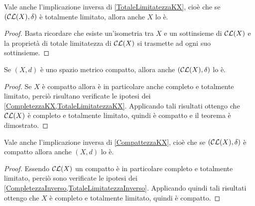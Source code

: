 \begin{remark}\label{TotaleLimitatezzaInverso}
	Vale anche l'implicazione inversa di \cref{TotaleLimitatezzaKX}, cioè che se  $(\mathcal{CL}(X),\delta)$ è totalmente limitato, allora anche $X$ lo è.
\end{remark}
\begin{proof}
	Basta ricordare che esiste un'isometria tra $X$ e un sottinsieme di $\mathcal{CL}(X)$ e la proprietà di totale limitatezza di $\mathcal{CL}(X)$ si trasmette ad ogni suo sottinsieme.
\end{proof}



\begin{theorem} \label{CompattezzaKX}
	Se $(X,d)$ è uno spazio metrico compatto, allora anche $(\mathcal{CL}(X),\delta)$ lo è.
\end{theorem}
\begin{proof}
	Se $X$ è compatto allora è in particolare anche completo e totalmente limitato, perciò risultano verificate le ipotesi dei \cref{CompletezzaKX,TotaleLimitatezzaKX}. Applicando tali risultati ottengo che $\mathcal{CL}(X)$ è completo e totalmente limitato, quindi è compatto e il teorema è dimostrato.
\end{proof}

\begin{remark} \label{CompattezzaInverso}
	Vale anche l'implicazione inversa di \cref{CompattezzaKX}, cioè che se  $(\mathcal{CL}(X),\delta)$ è compatto allora anche $(X,d)$ lo è.
\end{remark}
\begin{proof}
	Essendo $\mathcal{CL}(X)$ un compatto è in particolare completo e totalmente limitato, perciò sono verificate le ipotesi dei \cref{CompletezzaInverso,TotaleLimitatezzaInverso}. Applicando quindi tali risultati ottengo che $X$ è completo e totalmente limitato, quindi è compatto.
\end{proof}

